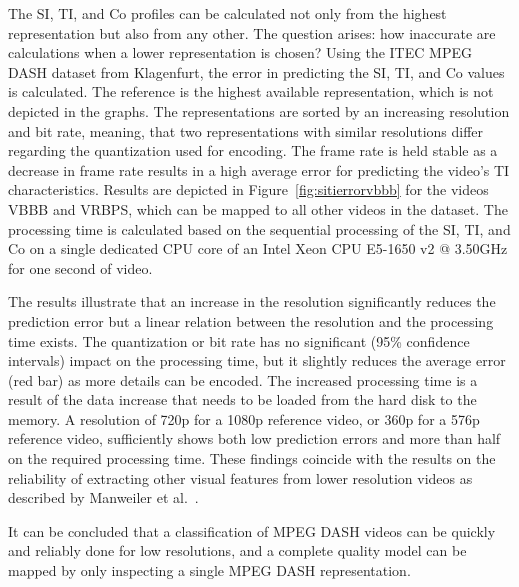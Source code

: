 The \ac{SI}, \ac{TI}, and \ac{Co} profiles can be calculated not only from the highest representation but also from any other.
The question arises: how inaccurate are calculations when a lower representation is chosen? 
Using the ITEC \ac{MPEG} \ac{DASH} dataset from Klagenfurt, the error in predicting the \ac{SI}, \ac{TI}, and \ac{Co} values is calculated.
The reference is the highest available representation, which is not depicted in the graphs.
The representations are sorted by an increasing resolution and bit rate, meaning, that two representations with similar resolutions differ regarding the quantization used for encoding. 
The frame rate is held stable as a decrease in frame rate results in a high average error for predicting the video's \ac{TI} characteristics.
Results are depicted in Figure~\ref{fig:sitierrorvbbb} for the videos VBBB and VRBPS, which can be mapped to all other videos in the dataset.
The processing time is calculated based on the sequential processing of the \ac{SI}, \ac{TI}, and \ac{Co} on a single dedicated \ac{CPU} core of an Intel Xeon CPU E5-1650 v2 @ 3.50GHz for one second of video.

The results illustrate that an increase in the resolution significantly reduces the prediction error but a linear relation between the resolution and the processing time exists.
The quantization or bit rate has no significant (95\% confidence intervals) impact on the processing time, but it slightly reduces the average error (red bar) as more details can be encoded. 
The increased processing time is a result of the data increase that needs to be loaded from the hard disk to the memory.
A resolution of \ac{720p} for a \ac{1080p} reference video, or \ac{360p} for a \ac{576p} reference video, sufficiently shows both low prediction errors and more than half on the required processing time.
These findings coincide with the results on the reliability of extracting other visual features from lower resolution videos as described by Manweiler et al.~\cite{Manweiler2012}.

It can be concluded that a classification of \ac{MPEG} \ac{DASH} videos can be quickly and reliably done for low resolutions, and a complete quality model can be mapped by only inspecting a single \ac{MPEG} \ac{DASH} representation.